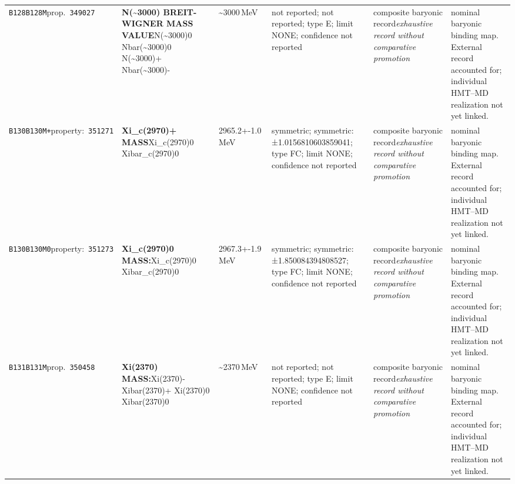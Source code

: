 \begin{landscape}
\begin{longtable}{L{1.85cm}L{4.45cm}L{2.35cm}L{4.05cm}L{3.35cm}L{7.15cm}}
\texttt{B128}\newline \texttt{B128M}\newline prop.\ \texttt{349027} & \textbf{N(\textasciitilde{}3000) BREIT-WIGNER MASS VALUE}\newline N(\textasciitilde{}3000)0 \textbar{}\allowbreak{} Nbar(\textasciitilde{}3000)0 \textbar{}\allowbreak{} N(\textasciitilde{}3000)+ \textbar{}\allowbreak{} Nbar(\textasciitilde{}3000)- & \textasciitilde{}3000\,MeV & not reported; not reported; type E; limit NONE; confidence not reported & composite baryonic record\newline \emph{exhaustive record without comparative promotion} & nominal baryonic binding map. External record accounted for; individual HMT--MD realization not yet linked. \\
\texttt{B130}\newline \texttt{B130M+}\newline property:\ \texttt{351271} & \textbf{Xi\_\allowbreak{}c(2970)+ MASS}\newline Xi\_\allowbreak{}c(2970)0 \textbar{}\allowbreak{} Xibar\_\allowbreak{}c(2970)0 & 2965.2+-1.0\,MeV & symmetric; symmetric: ±1.0156810603859041; type FC; limit NONE; confidence not reported & composite baryonic record\newline \emph{exhaustive record without comparative promotion} & nominal baryonic binding map. External record accounted for; individual HMT--MD realization not yet linked. \\
\texttt{B130}\newline \texttt{B130M0}\newline property:\ \texttt{351273} & \textbf{Xi\_\allowbreak{}c(2970)0 MASS:}\newline Xi\_\allowbreak{}c(2970)0 \textbar{}\allowbreak{} Xibar\_\allowbreak{}c(2970)0 & 2967.3+-1.9\,MeV & symmetric; symmetric: ±1.850084394808527; type FC; limit NONE; confidence not reported & composite baryonic record\newline \emph{exhaustive record without comparative promotion} & nominal baryonic binding map. External record accounted for; individual HMT--MD realization not yet linked. \\
\texttt{B131}\newline \texttt{B131M}\newline prop.\ \texttt{350458} & \textbf{Xi(2370) MASS:}\newline Xi(2370)- \textbar{}\allowbreak{} Xibar(2370)+ \textbar{}\allowbreak{} Xi(2370)0 \textbar{}\allowbreak{} Xibar(2370)0 & \textasciitilde{}2370\,MeV & not reported; not reported; type E; limit NONE; confidence not reported & composite baryonic record\newline \emph{exhaustive record without comparative promotion} & nominal baryonic binding map. External record accounted for; individual HMT--MD realization not yet linked. \\

\end{longtable}
\end{landscape}
